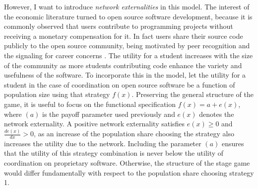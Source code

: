 However, I want to introduce \textit{network externalities} in this model. 
The interest of the economic literature turned to open source software 
development, because it is commonly observed that users contribute to 
programming projects without receiving a monetary compensation for it.
In fact users share their source code publicly to the open source community,
being motivated by peer recognition and the signaling for career concerns
\parencite[21]{lerner_simple_2002}.
The utility for a student increases with the size of the community as 
more students contributing code enhance the variety and usefulness of the 
software. 
To incorporate this in the model, let the utility for a student 
in the case of coordination on open source software be a function of 
population size using that strategy $f(x)$. 
Preserving the general structure of the
game, it is useful to focus on the functional specification 
$f(x) = a + e(x)$, where $(a)$ is the payoff parameter used 
previously and $e(x)$ denotes the network externality. 
A positive network externality satisfies $e(x)\geq 0$ and 
$\frac{de(x)}{dx}>0$, 
as an increase of the population share choosing the strategy
also increases the utility due to the network. 
Including the parameter $(a)$ ensures that the utility of this 
strategy combination is never below the utility of coordination on 
proprietary software. Otherwise, the structure of the stage game would 
differ fundamentally with respect to the population share choosing strategy 1. 

